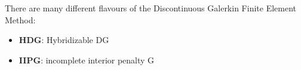 
There are many different flavours of the Discontinuous Galerkin Finite Element Method:
\begin{itemize}
\item {\bf HDG}: Hybridizable DG \cite{conp10}
\item {\bf IIPG}: incomplete interior penalty G  \cite{dole08}
\end{itemize}
